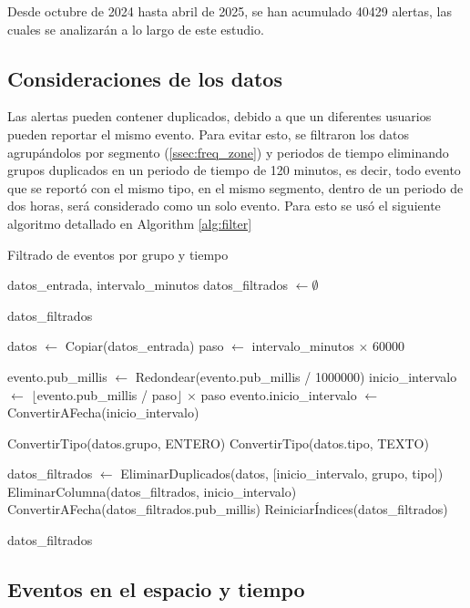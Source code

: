 \documentclass[12pt]{article}
\begin{document}
Desde octubre de 2024 hasta abril de 2025, se han acumulado 40429 alertas, las cuales se analizarán a lo largo de este estudio.

\subsection{Consideraciones de los datos}

Las alertas pueden contener duplicados, debido a que un diferentes usuarios pueden reportar el mismo evento. Para evitar esto, se filtraron los datos agrupándolos por segmento (\cref{ssec:freq_zone}) y periodos de tiempo eliminando grupos duplicados en un periodo de tiempo de 120 minutos, es decir, todo evento que se reportó con el mismo tipo, en el mismo segmento, dentro de un periodo de dos horas, será considerado como un solo evento. Para esto se usó el siguiente algoritmo detallado en Algorithm \cref{alg:filter}

\begin{algorithm}
\caption{Filtrado de eventos por grupo y tiempo}
\label{alg:filter}
\begin{algorithmic}[1]
\Require datos\_entrada, intervalo\_minutos
\State datos\_filtrados $\gets \emptyset$

    \Return datos\_filtrados
\EndIf

\State datos $\gets$ Copiar(datos\_entrada)
\State paso $\gets$ intervalo\_minutos $\times$ 60000 

        \State evento.pub\_millis $\gets$ Redondear(evento.pub\_millis / 1000000)
    \EndIf
    \State inicio\_intervalo $\gets$ $\lfloor$evento.pub\_millis / paso$\rfloor$ $\times$ paso
    \State evento.inicio\_intervalo $\gets$ ConvertirAFecha(inicio\_intervalo)
\EndFor

\State ConvertirTipo(datos.grupo, ENTERO)
\State ConvertirTipo(datos.tipo, TEXTO)

\State datos\_filtrados $\gets$ EliminarDuplicados(datos, [inicio\_intervalo, grupo, tipo])
\State EliminarColumna(datos\_filtrados, inicio\_intervalo)
\State ConvertirAFecha(datos\_filtrados.pub\_millis)
\State ReiniciarÍndices(datos\_filtrados)

\Return datos\_filtrados
\end{algorithmic}
\end{algorithm}


\subsection{Eventos en el espacio y tiempo}
\end{document}
